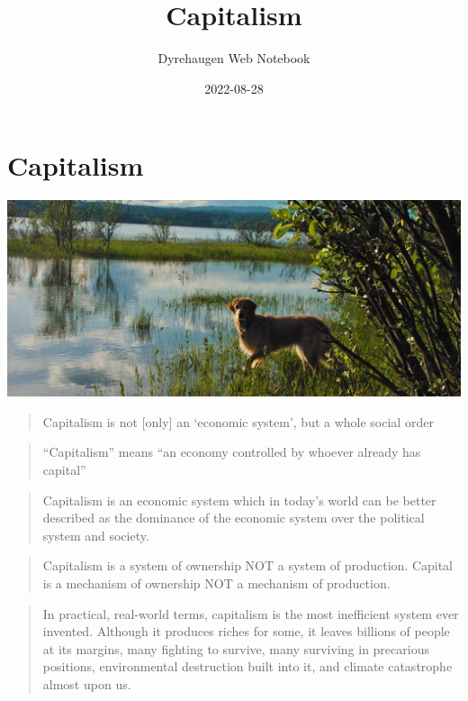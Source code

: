 \documentclass[
]{book}
\title{Capitalism}
\author{Dyrehaugen Web Notebook}
\date{2022-08-28}
\begin{document}
\maketitle

{
\setcounter{tocdepth}{1}
\tableofcontents
}
\hypertarget{capitalism}{%
\chapter{Capitalism}\label{capitalism}}

\includegraphics{fig/zelda.jpg}

\begin{quote}
Capitalism is not {[}only{]} an `economic system', but a whole social order
\end{quote}

\begin{quote}
``Capitalism'' means ``an economy controlled by whoever already has capital''
\end{quote}

\begin{quote}
Capitalism is an economic system which in today's world can be better described as the dominance of the economic system over the political system and society.
\end{quote}

\begin{quote}
Capitalism is a system of ownership NOT a system of production. Capital is a mechanism of ownership NOT a mechanism of production.
\end{quote}

\begin{quote}
In practical, real-world terms, capitalism is the most inefficient system ever invented. Although it produces riches for some, it leaves billions of people at its margins, many fighting to survive, many surviving in precarious positions, environmental destruction built into it, and climate catastrophe almost upon us.
\end{quote}
\end{document}
